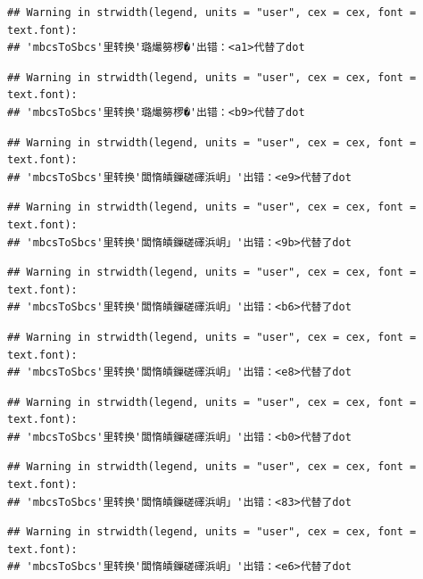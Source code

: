 \documentclass[
]{book}
\begin{document}
\begin{verbatim}
## Warning in strwidth(legend, units = "user", cex = cex, font = text.font):
## 'mbcsToSbcs'里转换'璐熶簩椤�'出错：<a1>代替了dot
\end{verbatim}

\begin{verbatim}
## Warning in strwidth(legend, units = "user", cex = cex, font = text.font):
## 'mbcsToSbcs'里转换'璐熶簩椤�'出错：<b9>代替了dot
\end{verbatim}

\begin{verbatim}
## Warning in strwidth(legend, units = "user", cex = cex, font = text.font):
## 'mbcsToSbcs'里转换'闆惰皟鏁磋礋浜岄」'出错：<e9>代替了dot
\end{verbatim}

\begin{verbatim}
## Warning in strwidth(legend, units = "user", cex = cex, font = text.font):
## 'mbcsToSbcs'里转换'闆惰皟鏁磋礋浜岄」'出错：<9b>代替了dot
\end{verbatim}

\begin{verbatim}
## Warning in strwidth(legend, units = "user", cex = cex, font = text.font):
## 'mbcsToSbcs'里转换'闆惰皟鏁磋礋浜岄」'出错：<b6>代替了dot
\end{verbatim}

\begin{verbatim}
## Warning in strwidth(legend, units = "user", cex = cex, font = text.font):
## 'mbcsToSbcs'里转换'闆惰皟鏁磋礋浜岄」'出错：<e8>代替了dot
\end{verbatim}

\begin{verbatim}
## Warning in strwidth(legend, units = "user", cex = cex, font = text.font):
## 'mbcsToSbcs'里转换'闆惰皟鏁磋礋浜岄」'出错：<b0>代替了dot
\end{verbatim}

\begin{verbatim}
## Warning in strwidth(legend, units = "user", cex = cex, font = text.font):
## 'mbcsToSbcs'里转换'闆惰皟鏁磋礋浜岄」'出错：<83>代替了dot
\end{verbatim}

\begin{verbatim}
## Warning in strwidth(legend, units = "user", cex = cex, font = text.font):
## 'mbcsToSbcs'里转换'闆惰皟鏁磋礋浜岄」'出错：<e6>代替了dot
\end{verbatim}
\end{document}
